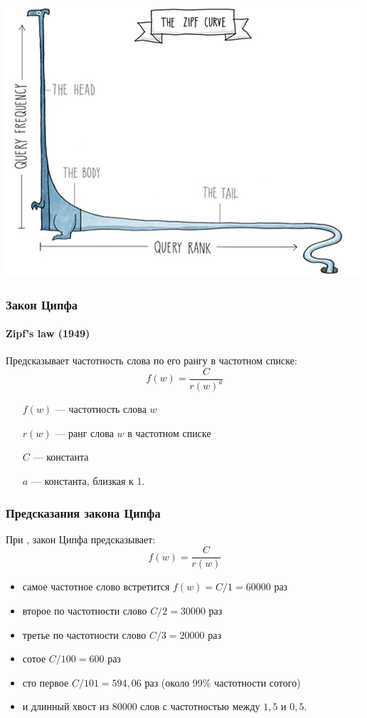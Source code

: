 \documentclass[svgnames]{beamer}
\begin{document}
\begin{frame}[plain]
  \includegraphics[width=\textwidth]{zipf-animal}
\end{frame}

\begin{frame}
  \frametitle{Закон Ципфа}
  \framesubtitle{Zipf's law (1949)}
  Предсказывает частотность слова по его рангу в частотном списке:
    \begin{equation}
      f(w) = \frac{C}{r(w)^a}
    \end{equation}
    \begin{itemize}
    \item[$f(w)$] — частотность слова $w$
    \item[$r(w)$] — ранг слова $w$ в частотном списке
    \item[$C$] — константа
    \item[$a$] — константа, близкая к 1.
    \end{itemize}
\end{frame}

\begin{frame}
  \frametitle{Предсказания закона Ципфа}
  При ,  закон Ципфа предсказывает:
  $$
       f(w) = \frac{C}{r(w)}
  $$
 \begin{itemize}
  \item самое частотное слово встретится $f(w)=C/1=60000$ раз
  \item второе по частотности слово $C/2=30000$ раз
  \item третье по частотности слово $C/3=20000$ раз
  \item сотое $C/100=600$ раз
  \item сто первое $C/101=594,06$ раз (около 99\% частотности сотого)
  \item и длинный хвост из 80000 слов с частотностью между $1,5$ и $0,5$.
  \end{itemize}
\end{frame}
\end{document}
